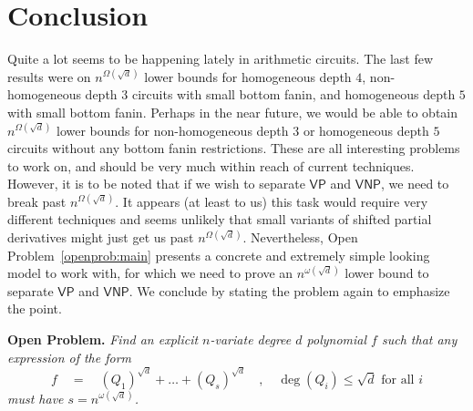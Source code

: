\documentclass{beatcs}
\newcommand{\VP}{\mathsf{VP}}
\newcommand{\VNP}{\mathsf{VNP}}
\begin{document}
\section{Conclusion}\label{sec:conc}

Quite a lot seems to be happening lately in arithmetic circuits. The last few results were on $n^{\Omega(\sqrt{d})}$ lower bounds for homogeneous depth $4$, non-homogeneous depth $3$ circuits with small bottom fanin, and homogeneous depth $5$ with small bottom fanin. Perhaps in the near future, we would be able to obtain $n^{\Omega(\sqrt{d})}$ lower bounds for non-homogeneous depth $3$ or homogeneous depth $5$ circuits without any bottom fanin restrictions. These are all interesting problems to work on, and should be very much within reach of current techniques. However, it is to be noted that if we wish to separate $\VP$ and $\VNP$, we need to break past $n^{\Omega(\sqrt{d})}$. It appears (at least to us) this task would require very different techniques and seems unlikely that small variants of shifted partial derivatives might just get us past $n^{\Omega(\sqrt{d})}$. Nevertheless, Open Problem~\ref{openprob:main} presents a concrete and extremely simple looking model to work with, for which we need to prove an $n^{\omega(\sqrt{d})}$ lower bound to separate $\VP$ and $\VNP$. We conclude by stating the problem again to emphasize the point. 

\begin{mdframed}
{\bf Open Problem. } {\em Find an explicit $n$-variate degree $d$ polynomial $f$ such that any expression of the form
\[
f \quad=\quad (Q_1)^{\sqrt{d}} + \dots + (Q_{s})^{\sqrt{d}}\quad,\quad \deg(Q_i) \leq \sqrt{d} \text{ for all $i$}
\]
must have $s = n^{\omega(\sqrt{d})}$. }
\end{mdframed}




\end{document}

